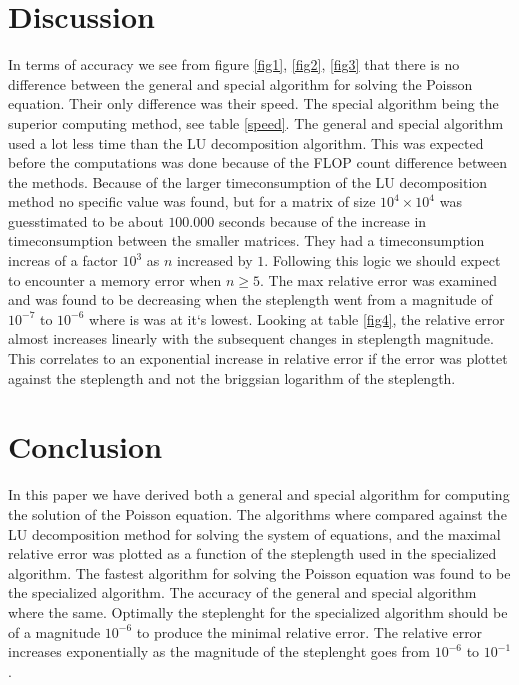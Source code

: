 \documentclass[english,a4paper, 11pt]{article}
\begin{document}
\section{Discussion}

In terms of accuracy we see from figure \ref{fig1}, \ref{fig2}, \ref{fig3} that there is no difference between the general and special algorithm for solving the Poisson equation. Their only difference was their speed. The special algorithm being the superior computing method, see table \ref{speed}. The general and special algorithm used a lot less time than the LU decomposition algorithm. This was expected before the computations was done because of the FLOP count difference between the methods. Because of the larger timeconsumption of the LU decomposition method no specific value was found, but for a matrix of size $10^4 \times 10^4$ was  guesstimated to be about $100.000$ seconds because of the increase in timeconsumption between the smaller matrices. They had a timeconsumption increas of a factor $10^3$ as $n$ increased by $1$. Following this logic we should expect to encounter a memory error when $n \geq 5$.
The max relative error was examined and was found to be decreasing when the steplength went from a magnitude of $10^{-7}$ to $10^{-6}$ where is was at it`s lowest. Looking at table \ref{fig4}, the relative error almost increases linearly with the subsequent changes in steplength magnitude. This correlates to an exponential increase in relative error if the error was plottet against the steplength and not the briggsian logarithm of the steplength. 



\section{Conclusion}
In this paper we have derived both a general and special algorithm for computing the solution of the Poisson equation. The algorithms where compared against the LU decomposition method for solving the system of equations, and the maximal relative error was plotted as a function of the steplength used in the specialized algorithm. 
\newline
The fastest algorithm for solving the Poisson equation was found to be the specialized algorithm. The accuracy of the general and special algorithm where the same. Optimally the steplenght for the specialized algorithm should be of a magnitude $10^{-6}$ to produce the minimal relative error. The relative error increases exponentially as the magnitude of the steplenght goes from $10^{-6}$ to $10^{-1}$. 
\end{document}
